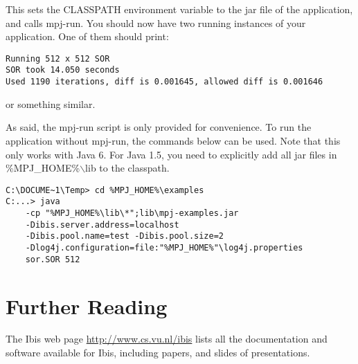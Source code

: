 \documentclass[a4paper,10pt]{article}
\begin{document}
This sets the CLASSPATH environment variable to the jar file of the
application, and calls mpj-run. You should now have two running
instances of your application. One of them should print:

\noindent
{\small
\begin{verbatim}
Running 512 x 512 SOR
SOR took 14.050 seconds
Used 1190 iterations, diff is 0.001645, allowed diff is 0.001646
\end{verbatim}
}
\noindent

or something similar.

As said, the mpj-run script is only provided for convenience. To run
the application without mpj-run, the commands below can be used.
Note that this only works with Java 6. For Java 1.5, you need to
explicitly add all jar files in \%MPJ\_HOME\%$\backslash$lib to the classpath.

\noindent
{\small
\begin{verbatim}
C:\DOCUME~1\Temp> cd %MPJ_HOME%\examples
C:...> java
    -cp "%MPJ_HOME%\lib\*";lib\mpj-examples.jar
    -Dibis.server.address=localhost
    -Dibis.pool.name=test -Dibis.pool.size=2
    -Dlog4j.configuration=file:"%MPJ_HOME%"\log4j.properties
    sor.SOR 512
\end{verbatim}
}
\noindent

\section{Further Reading}

The Ibis web page \url{http://www.cs.vu.nl/ibis} lists all
the documentation and software available for Ibis, including papers, and
slides of presentations.
\end{document}
